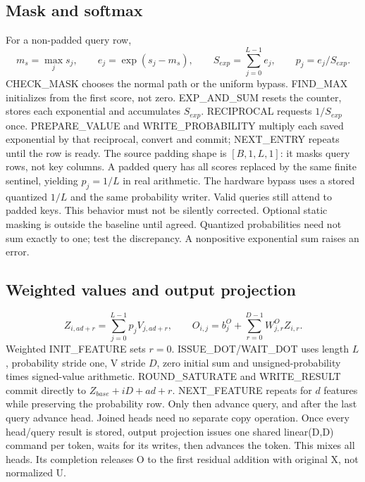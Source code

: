 \subsection{Mask and softmax}
For a non-padded query row,
\[
m_s=\max_j s_j,\qquad e_j=\exp(s_j-m_s),\qquad
S_{exp}=\sum_{j=0}^{L-1}e_j,\qquad p_j=e_j/S_{exp}.
\]
CHECK\_MASK chooses the normal path or the uniform bypass. FIND\_MAX initializes from the first score, not zero. EXP\_AND\_SUM resets the counter, stores each exponential and accumulates $S_{exp}$. RECIPROCAL requests $1/S_{exp}$ once. PREPARE\_VALUE and WRITE\_PROBABILITY multiply each saved exponential by that reciprocal, convert and commit; NEXT\_ENTRY repeats until the row is ready.
The source padding shape is $[B,1,L,1]$: it masks query rows, not key columns. A padded query has all scores replaced by the same finite sentinel, yielding $p_j=1/L$ in real arithmetic. The hardware bypass uses a stored quantized $1/L$ and the same probability writer. Valid queries still attend to padded keys. This behavior must not be silently corrected. Optional static masking is outside the baseline until agreed. Quantized probabilities need not sum exactly to one; test the discrepancy. A nonpositive exponential sum raises an error.

\subsection{Weighted values and output projection}
\[
Z_{i,ad+r}=\sum_{j=0}^{L-1}p_j V_{j,ad+r},\qquad
O_{i,j}=b^O_j+\sum_{r=0}^{D-1}W^O_{j,r}Z_{i,r}.
\]
Weighted INIT\_FEATURE sets $r=0$. ISSUE\_DOT/WAIT\_DOT uses length $L$, probability stride one, V stride $D$, zero initial sum and unsigned-probability times signed-value arithmetic. ROUND\_SATURATE and WRITE\_RESULT commit directly to $Z_{base}+iD+ad+r$. NEXT\_FEATURE repeats for $d$ features while preserving the probability row. Only then advance query, and after the last query advance head. Joined heads need no separate copy operation.
Once every head/query result is stored, output projection issues one shared linear(D,D) command per token, waits for its writes, then advances the token. This mixes all heads. Its completion releases O to the first residual addition with original X, not normalized U.

